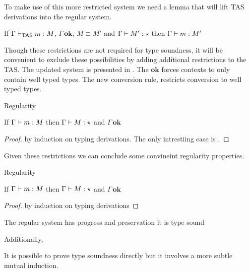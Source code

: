 To make use of this more restricted system we need a lemma that will lift \ac{TAS} derivations into the regular system.


\begin{conjecture}
  If $\Gamma\vdash_{\mathrm{TAS}}{}m:M$, $\Gamma\,\mathbf{ok}$, $M\equiv M'$ and $\Gamma\vdash{}M':\star$ then $\Gamma\vdash{}m:M'$
\end{conjecture}




Though these restrictions are not required for type soundness, it will be convenient to exclude these possibilities by adding additional restrictions to the \ac{TAS}.
The updated system is presented in .
The $\mathbf{ok}$ forces contexts to only contain well typed types.
The new conversion rule, restricts conversion to well typed types.



\begin{thm}
  Regularity
  
  If $\Gamma\vdash{}m:M$ then $\Gamma\vdash{}M:\star$ and $\Gamma\,\mathbf{ok}$
\end{thm}
\begin{proof}
  by induction on typing derivations. The only intrestiing case is .  
\end{proof}


Given these restrictions we can conclude some convineint regularity properties.
\begin{thm}
  Regularity
  
  If $\Gamma\vdash{}m:M$ then $\Gamma\vdash{}M:\star$ and $\Gamma\,\mathbf{ok}$
\end{thm}
\begin{proof}
  by induction on typing derivations
\end{proof}

\begin{conjecture}
The regular system has progress and preservation it is type sound
\end{conjecture}

Additionally, 

It is possible to prove type soundness directly but it involves a more subtle mutual induction.

